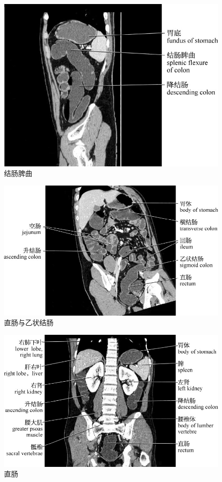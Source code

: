 \begin{figure}[!htbp]
 \centering
 \includegraphics{./images/Image00181.jpg}
 \captionsetup{justification=centering}
 \caption{结肠脾曲}
  \end{figure} 
 \FloatBarrier

\begin{figure}[!htbp]
 \centering
 \includegraphics{./images/Image00182.jpg}
 \captionsetup{justification=centering}
 \caption{直肠与乙状结肠}
  \end{figure} 
 \FloatBarrier

\begin{figure}[!htbp]
 \centering
 \includegraphics{./images/Image00183.jpg}
 \captionsetup{justification=centering}
 \caption{直肠}
  \end{figure} 
 \FloatBarrier


